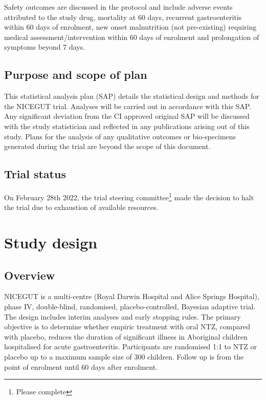\documentclass[a4paper]{article}
\begin{document}
Safety outcomes are discussed in the protocol \cite{Waddingtone019632} and include adverse events attributed to the study drug, mortality at 60 days, recurrent gastroenteritis within 60 days of enrolment, new onset malnutrition (not pre-existing) requiring medical assessment/intervention within 60 days of enrolment and prolongation of symptoms beyond 7 days.

\subsection{Purpose and scope of plan}
This statistical analysis plan (SAP) details the statistical design and methods for the NICEGUT trial. 
Analyses will be carried out in accordance with this SAP. 
Any significant deviation from the CI approved original SAP will be discussed with the study statistician and reflected in any publications arising out of this study.
Plans for the analysis of any qualitative outcomes or bio-specimens generated during the trial are beyond the scope of this document.

\subsection{Trial status}

On February 28th 2022, the trial steering committee\footnote{Please complete} made the decision to halt the trial due to exhaustion of available resources.

\section{Study design}

\subsection{Overview}

NICEGUT is a multi-centre (Royal Darwin Hospital and Alice Springs Hospital), phase IV, double-blind, randomised, placebo-controlled, Bayesian adaptive trial.
The design includes interim analyses and early stopping rules.
The primary objective is to determine whether empiric treatment with oral NTZ, compared with placebo, reduces the duration of significant illness in Aboriginal children hospitalised for acute gastroenteritis.
Participants are randomised 1:1 to NTZ or placebo up to a maximum sample size of 300 children.
Follow up is from the point of enrolment until 60 days after enrolment.
\end{document}
